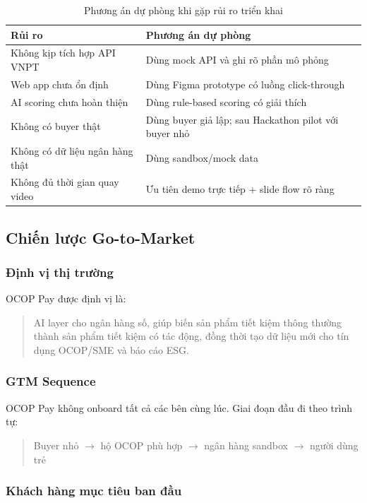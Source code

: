 \documentclass[13pt,a4paper]{extarticle}
\begin{document}
\begin{table}[H]
\centering
\caption{Phương án dự phòng khi gặp rủi ro triển khai}
\begin{tabular}{|p{5cm}|p{8cm}|}
\hline
\textbf{Rủi ro} & \textbf{Phương án dự phòng} \\
\hline
Không kịp tích hợp API VNPT & Dùng mock API và ghi rõ phần mô phỏng \\
\hline
Web app chưa ổn định & Dùng Figma prototype có luồng click-through \\
\hline
AI scoring chưa hoàn thiện & Dùng rule-based scoring có giải thích \\
\hline
Không có buyer thật & Dùng buyer giả lập; sau Hackathon pilot với buyer nhỏ \\
\hline
Không có dữ liệu ngân hàng thật & Dùng sandbox/mock data \\
\hline
Không đủ thời gian quay video & Ưu tiên demo trực tiếp + slide flow rõ ràng \\
\hline
\end{tabular}
\end{table}

\subsection{Chiến lược Go-to-Market}

\subsubsection{Định vị thị trường}

OCOP Pay được định vị là:
\begin{quote}
AI layer cho ngân hàng số, giúp biến sản phẩm tiết kiệm thông thường thành sản phẩm tiết kiệm có tác động, đồng thời tạo dữ liệu mới cho tín dụng OCOP/SME và báo cáo ESG.
\end{quote}

\subsubsection{GTM Sequence}

OCOP Pay không onboard tất cả các bên cùng lúc. Giai đoạn đầu đi theo trình tự:
\begin{quote}
Buyer nhỏ $\rightarrow$ hộ OCOP phù hợp $\rightarrow$ ngân hàng sandbox $\rightarrow$ người dùng trẻ
\end{quote}

\subsubsection{Khách hàng mục tiêu ban đầu}
\end{document}
